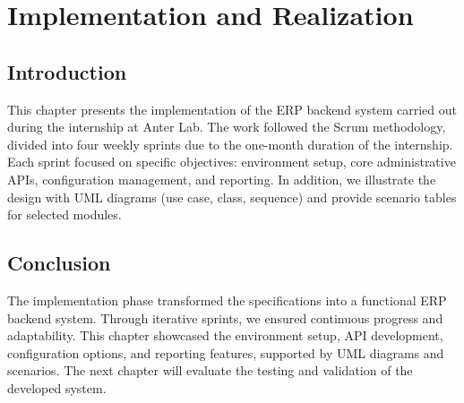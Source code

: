 \chapter{Implementation and Realization}
\minitoc %

\section*{Introduction}
This chapter presents the implementation of the ERP backend system carried out during the internship at Anter Lab. 
The work followed the Scrum methodology, divided into four weekly sprints due to the one-month duration of the internship. 
Each sprint focused on specific objectives: environment setup, core administrative APIs, configuration management, and reporting. 
In addition, we illustrate the design with UML diagrams (use case, class, sequence) and provide scenario tables for selected modules.


%
%
%

\section*{Conclusion}
The implementation phase transformed the specifications into a functional ERP backend system. 
Through iterative sprints, we ensured continuous progress and adaptability. 
This chapter showcased the environment setup, API development, configuration options, and reporting features, supported by UML diagrams and scenarios. 
The next chapter will evaluate the testing and validation of the developed system.
